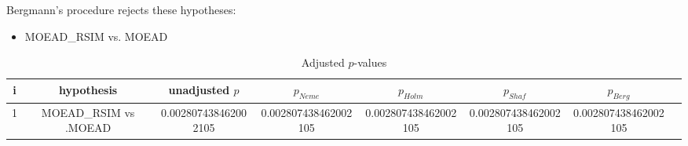 \documentclass[a4paper,10pt]{article}
\begin{document}
\begin{landscape}
Bergmann's procedure rejects these hypotheses:


\begin{itemize}


\item MOEAD_RSIM vs. MOEAD
\end{itemize}


\begin{table}[!htp]
\centering\tiny
\caption{Adjusted $p$-values}
\begin{tabular}{cccccccc}
i&hypothesis&unadjusted $p$&$p_{Neme}$&$p_{Holm}$&$p_{Shaf}$&$p_{Berg}$\\
\hline
1&MOEAD_RSIM vs .MOEAD&0.002807438462002105&0.002807438462002105&0.002807438462002105&0.002807438462002105&0.002807438462002105\\
\hline
\end{tabular}
\end{table}

\end{landscape}
\end{document}
